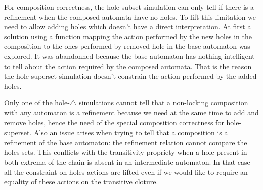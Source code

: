 \documentclass{article}
\begin{document}
\smallskip
For composition correctness, the hole-subset simulation can only tell if there is a refinement when the composed automata have no holes.
To lift this limitation we need to allow adding holes which doesn't have a direct interpretation.
At first a solution using a function mapping the action performed by the new holes in the composition to the ones performed by removed hole in the base automaton was explored.
It was abandonned because the base automaton has nothing intelligent to tell about the action required by the composed automata.
That is the reason the hole-superset simulation doesn't constrain the action performed by the added holes.

Only one of the hole-\(\triangle\) simulations cannot tell that a non-locking composition with any automaton is a refinement because we need at the same time to add and remove holes, hence the need of the special composition correctness for hole-superset.
Also an issue arises when trying to tell that a composition is a refinement of the base automaton: the refinement relation cannot compare the holes sets.
This conflicts with the transitivity propriety when a hole present in both extrema of the chain is absent in an intermediate automaton.
In that case all the constraint on holes actions are lifted even if we would like to require an equality of these actions on the transitive cloture.
\end{document}
